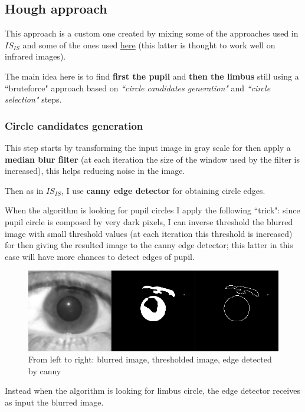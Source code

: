 \documentclass{article}
\begin{document}
\subsection{Hough approach}
This approach is a custom one created by mixing some of the approaches used in $IS_{IS}$ and some of the ones used \href{https://github.com/andreibercu/iris-recognition}{here} (this latter is thought to work well on infrared images).

\bigskip
The main idea here is to find \textbf{first the pupil} and \textbf{then the limbus} still using a ``bruteforce" approach based on \textit{``circle candidates generation"} and \textit{``circle selection"} steps.

\subsubsection{Circle candidates generation}
This step starts by transforming the input image in gray scale for then apply a \textbf{median blur filter} (at each iteration the size of the window used by the filter is increased), this helps reducing noise in the image.

\bigskip
Then as in $IS_{IS}$, I use \textbf{canny edge detector} for obtaining circle edges. 

When the algorithm is looking for pupil circles I apply the following ``trick": since pupil circle is composed by very dark pixels, I can inverse threshold the blurred image with small threshold values (at each iteration this threshold is increased) for then giving the resulted image to the canny edge detector; this latter in this case will have more chances to detect edges of pupil. 

\begin{figure}[H]
    \centering
    \includegraphics[width=4.5in]{imgs/threhsolded.PNG}
    \caption{From left to right: blurred image, thresholded image, edge detected by canny}
    \label{fig:thresholded}
\end{figure}

Instead when the algorithm is looking for limbus circle, the edge detector receives as input the blurred image.
\end{document}
